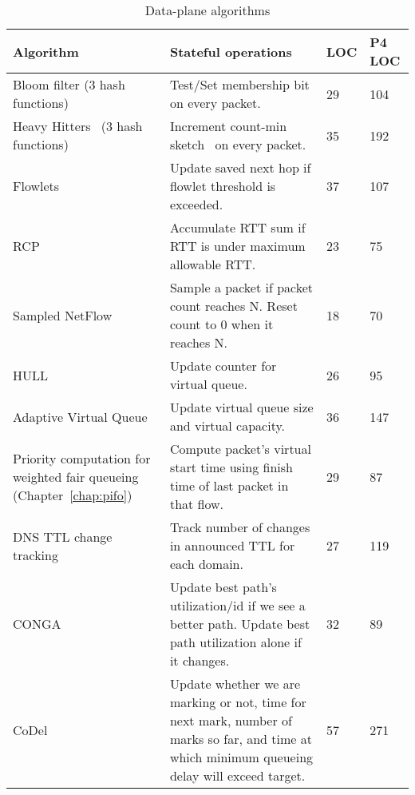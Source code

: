 \begin{table}[!t]
\begin{small}
  \begin{tabular}{|p{}|p{}|p{}|p{}|}
\hline
Algorithm & Stateful operations & LOC & P4 LOC\\
\hline
Bloom filter (3 hash functions) & Test/Set membership bit on every packet. & 29 & 104 \\
\hline
Heavy Hitters~\cite{opensketch} (3 hash functions) & Increment count-min sketch~\cite{cormode} on every packet. & 35 & 192 \\
\hline
Flowlets~\cite{flowlets} & Update saved next hop if flowlet threshold is exceeded.& 37 & 107 \\
\hline
RCP~\cite{rcp} & Accumulate RTT sum if RTT is under maximum allowable RTT. & 23 & 75 \\
\hline
Sampled NetFlow~\cite{sampled_nflow} & Sample a packet if packet count reaches N. Reset count to 0 when it reaches N. & 18 & 70 \\
\hline
HULL~\cite{hull} & Update counter for virtual queue. & 26 & 95 \\
\hline
Adaptive Virtual Queue~\cite{avq} & Update virtual queue size and virtual capacity. & 36 & 147 \\
\hline
Priority computation for weighted fair queueing (Chapter~\ref{chap:pifo}) & Compute packet's virtual start time using finish time of last packet in that flow. & 29 & 87 \\
\hline
DNS TTL change tracking~\cite{dns_change} & Track number of changes in announced TTL for each domain. & 27 & 119 \\
\hline
CONGA~\cite{conga} & Update best path's utilization/id if we see a better path. Update best path utilization alone if it changes.  & 32 & 89\\
\hline
CoDel~\cite{codel} & Update whether we are marking or not, time for next mark, number of marks so far, and time at which minimum queueing delay will exceed target. & 57 & 271\\
\hline
\end{tabular}
\end{small}
\caption{Data-plane algorithms}
\label{tab:algorithms}
\end{table}

